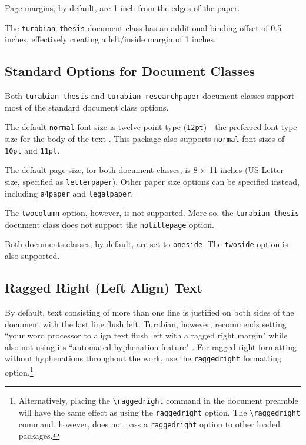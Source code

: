 \documentclass{article}
\newcommand{\textcmd}[1]{\texttt{\textbackslash #1}}
\begin{document}
Page margins, by default, are 1 inch from the edges of the paper.

The \texttt{turabian-thesis} document class has an additional binding offset of 0.5 inches, effectively creating a left/inside margin of 1 inches.


\subsection{Standard Options for Document Classes}

Both \texttt{turabian-thesis} and \texttt{turabian-researchpaper} document classes support most of the standard document class options.

The default \texttt{normal} font size is twelve-point type (\texttt{12pt})---the preferred font type size for the body of the text \autocite[373]{turabian_manual_2013}. This package also supports \texttt{normal} font sizes of \texttt{10pt} and \texttt{11pt}.

The default page size, for both document classes, is 8 × 11 inches (US Letter size, specified as \texttt{letterpaper}). Other paper size options can be specified instead, including \texttt{a4paper} and \texttt{legalpaper}.

The \texttt{twocolumn} option, however, is not supported. More so, the \texttt{turabian-thesis} document class does not support the \texttt{notitlepage} option.

Both documents classes, by default, are set to \texttt{oneside}. The \texttt{twoside} option is also supported.

\clearpage
\subsection{Ragged Right (Left Align) Text}
\label{subsec:raggedright}

%
By default, text consisting of more than one line is justified on both sides of the document with the last line flush left. Turabian, however, recommends setting ``your word processor to align text flush left with a ragged right margin" while also not using its ``automated hyphenation feature" \autocite[404]{turabian_manual_2013}. For ragged right formatting without hyphenations throughout the work, use the \texttt{raggedright} formatting option.\footnote{%
	Alternatively, placing the \textcmd{raggedright} command in the document preamble will have the same effect as using the \texttt{raggedright} option. The \textcmd{raggedright} command, however, does not pass a \texttt{raggedright} option to other loaded packages.}
\end{document}
